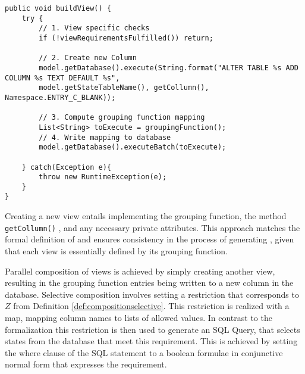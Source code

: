 \documentclass[preview]{standalone}
\begin{document}
	\begin{lstlisting}[style=javaStyle, caption={Implementation of \texttt{buildView() function}}, label={lst:buildview}]
public void buildView() {
	try {	
		// 1. View specific checks
		if (!viewRequirementsFulfilled()) return;
					
		// 2. Create new Column 
		model.getDatabase().execute(String.format("ALTER TABLE %s ADD COLUMN %s TEXT DEFAULT %s",
		model.getStateTableName(), getCollumn(), Namespace.ENTRY_C_BLANK));
		
		// 3. Compute grouping function mapping
		List<String> toExecute = groupingFunction();				
		// 4. Write mapping to database
		model.getDatabase().executeBatch(toExecute);
		
	} catch(Exception e){
		throw new RuntimeException(e);
	}		
}

\end{lstlisting}

%			



Creating a new view entails implementing the grouping function, the method \texttt{getCollumn()} , and any necessary private attributes. This approach matches the formal definition of \viewsN and ensures consistency in the process of generating \viewsN, given that each view is essentially defined by its grouping function.

Parallel composition of views is achieved by simply creating another view, resulting in the grouping function entries being written to a new column in the database. Selective composition involves setting a  restriction that corresponds to $Z$ from Definition \ref{def:compositionselective}. This restriction is realized with a map, mapping column names to lists of allowed values. In contrast to the formalization this restriction is then used to generate an SQL Query, that selects states from the database that meet this requirement. This is achieved by setting the where clause of the SQL statement to a boolean formulae in conjunctive normal form that expresses the requirement.
\end{document}
